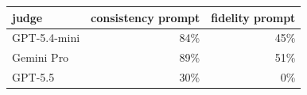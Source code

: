 \begin{tabular}{lrr}
\toprule
judge & consistency prompt & fidelity prompt \\
\midrule
GPT-5.4-mini & 84\% & 45\% \\
Gemini Pro & 89\% & 51\% \\
GPT-5.5 & 30\% & 0\% \\
\bottomrule
\end{tabular}
